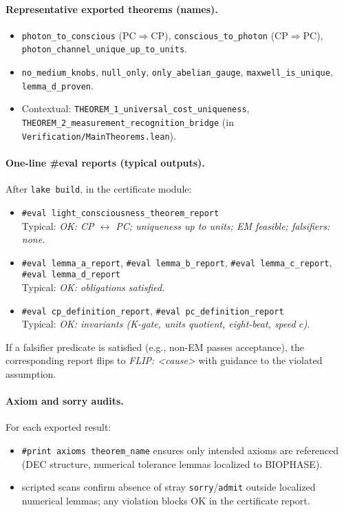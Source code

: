 \documentclass[12pt,a4paper]{article}
\begin{document}
\paragraph{Representative exported theorems (names).}
\begin{itemize}
  \item \texttt{photon\_to\_conscious} (PC\(\Rightarrow\)CP), \texttt{conscious\_to\_photon} (CP\(\Rightarrow\)PC), \texttt{photon\_channel\_unique\_up\_to\_units}.
  \item \texttt{no\_medium\_knobs}, \texttt{null\_only}, \texttt{only\_abelian\_gauge}, \texttt{maxwell\_is\_unique}, \texttt{lemma\_d\_proven}.
  \item Contextual: \texttt{THEOREM\_1\_universal\_cost\_uniqueness}, \texttt{THEOREM\_2\_measurement\_recognition\_bridge} (in \texttt{Verification/MainTheorems.lean}).
\end{itemize}

\paragraph{One-line \#eval reports (typical outputs).}
After \texttt{lake build}, in the certificate module:
\begin{itemize}
  \item \texttt{\#eval light\_consciousness\_theorem\_report} \\
    Typical: \emph{OK: CP \(\leftrightarrow\) PC; uniqueness up to units; EM feasible; falsifiers: none.}
  \item \texttt{\#eval lemma\_a\_report}, \texttt{\#eval lemma\_b\_report}, \texttt{\#eval lemma\_c\_report}, \texttt{\#eval lemma\_d\_report} \\
    Typical: \emph{OK: obligations satisfied.}
  \item \texttt{\#eval cp\_definition\_report}, \texttt{\#eval pc\_definition\_report} \\
    Typical: \emph{OK: invariants (K-gate, units quotient, eight-beat, speed \(c\))}.
\end{itemize}
If a falsifier predicate is satisfied (e.g., non-EM passes acceptance), the corresponding report flips to \emph{FLIP: <cause>} with guidance to the violated assumption.

\paragraph{Axiom and sorry audits.}
For each exported result:
\begin{itemize}
  \item \texttt{\#print axioms theorem\_name} ensures only intended axioms are referenced (DEC structure, numerical tolerance lemmas localized to BIOPHASE).
  \item scripted scans confirm absence of stray \texttt{sorry}/\texttt{admit} outside localized numerical lemmas; any violation blocks OK in the certificate report.
\end{itemize}
\end{document}
